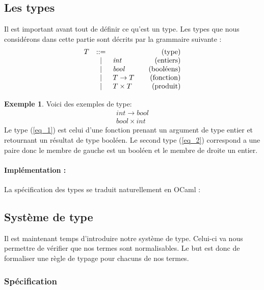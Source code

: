 \documentclass {article}
\makeatletter
\newcommand{\codefrom}[3]
           {}
\theoremstyle{definition}
\newtheorem{example}{Exemple}
\theoremstyle{remark}
\newenvironment{bnf}
               {\[\begin{array}{lcl@{\qquad}r}}
               {\end{array}\]}
\makeatother
\begin{document}
\subsection{Les types}
\label{simple_type}


\newcommand{\intg}{\ensuremath{\mathit{int}}}
\newcommand{\bool}{\ensuremath{\mathit{bool}}}

Il est important avant tout de définir ce qu'est un type. Les types
que nous considérons dans cette partie sont décrits par la grammaire
suivante :
%
\begin{bnf}
  T &::=& &\mbox{(type)}\\
  &|& \intg{} &\mbox{(entiers)}\\ 
  &|& \bool{} &\mbox{(booléens)}\\
  &|& T \rightarrow T &\mbox{(fonction)}\\
  &|& T \times T &\mbox{(produit)}\\
\end{bnf}

\begin{example}
  Voici des exemples de type:
  \begin{eqnarray}
    \intg \rightarrow \bool  \label{eq_1}  \\
    \bool \times \intg \label{eq_2} 
  \end{eqnarray}
  Le type (\ref{eq_1}) est celui d'une fonction prenant un argument de type entier et 
  retournant un résultat de type booléen.
  Le second type (\ref{eq_2}) correspond a une paire donc le membre de gauche est un booléen
  et le membre de droite un entier.
\end{example}

\paragraph{Implémentation :}

La spécification des types se traduit naturellement en OCaml :
%
\codefrom{typed}{lambda}{Type}


\subsection{Système de type}

Il est maintenant temps d'introduire notre système de type. Celui-ci va nous permettre de vérifier que nos termes 
sont normalisables. Le but est donc de formaliser une règle de typage pour chacuns de nos termes.

\subsubsection{Spécification}
\end{document}
